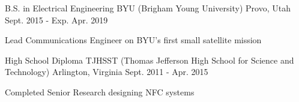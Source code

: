 

\begin{cventries}

  \cventry
  {B.S. in Electrical Engineering} %
  {BYU (Brigham Young University)} %
  {Provo, Utah} %
  {Sept. 2015 - Exp. Apr. 2019} %
    {
      \begin{cvitems} %
      \item {Lead Communications Engineer on BYU's first small satellite mission}
      \end{cvitems}
    }

  \cventry
  {High School Diploma} %
  {TJHSST (Thomas Jefferson High School for Science and Technology)} %
  {Arlington, Virginia} %
  {Sept. 2011 - Apr. 2015} %
    {
      \begin{cvitems} %
      \item {Completed Senior Research designing NFC systems}
      \end{cvitems}
    }

\end{cventries}
